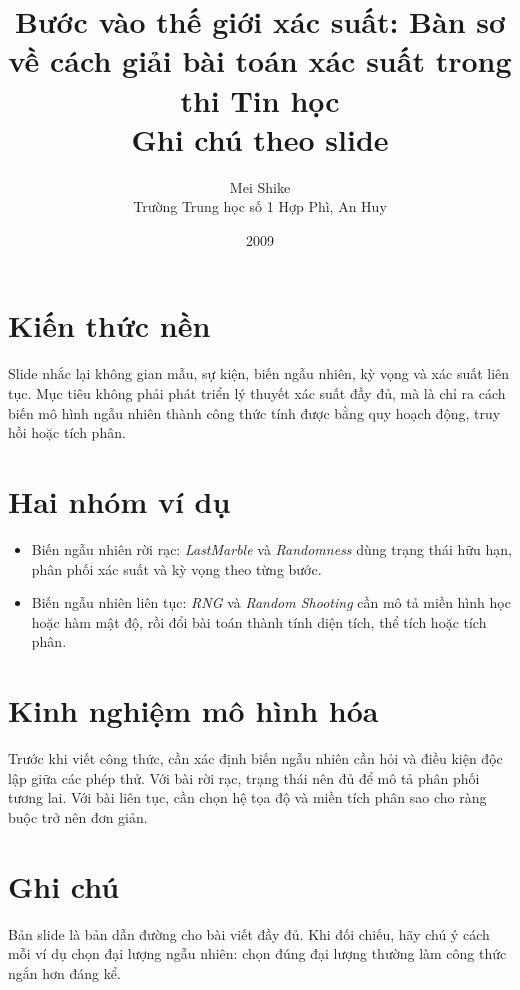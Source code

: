\documentclass[11pt]{article}
\title{Bước vào thế giới xác suất: Bàn sơ về cách giải bài toán xác suất trong thi Tin học\\{\large Ghi chú theo slide}}
\author{Mei Shike\\Trường Trung học số 1 Hợp Phì, An Huy}
\date{2009}
\begin{document}
\maketitle


\section{Kiến thức nền}

Slide nhắc lại không gian mẫu, sự kiện, biến ngẫu nhiên, kỳ vọng và xác suất
liên tục. Mục tiêu không phải phát triển lý thuyết xác suất đầy đủ, mà là chỉ
ra cách biến mô hình ngẫu nhiên thành công thức tính được bằng quy hoạch động,
truy hồi hoặc tích phân.

\section{Hai nhóm ví dụ}

\begin{itemize}
  \item Biến ngẫu nhiên rời rạc: \textit{LastMarble} và \textit{Randomness}
  dùng trạng thái hữu hạn, phân phối xác suất và kỳ vọng theo từng bước.
  \item Biến ngẫu nhiên liên tục: \textit{RNG} và \textit{Random Shooting}
  cần mô tả miền hình học hoặc hàm mật độ, rồi đổi bài toán thành tính diện
  tích, thể tích hoặc tích phân.
\end{itemize}

\section{Kinh nghiệm mô hình hóa}

Trước khi viết công thức, cần xác định biến ngẫu nhiên cần hỏi và điều kiện
độc lập giữa các phép thử. Với bài rời rạc, trạng thái nên đủ để mô tả phân
phối tương lai. Với bài liên tục, cần chọn hệ tọa độ và miền tích phân sao cho
ràng buộc trở nên đơn giản.

\section{Ghi chú}

Bản slide là bản dẫn đường cho bài viết đầy đủ. Khi đối chiếu, hãy chú ý cách
mỗi ví dụ chọn đại lượng ngẫu nhiên: chọn đúng đại lượng thường làm công thức
ngắn hơn đáng kể.
\end{document}
